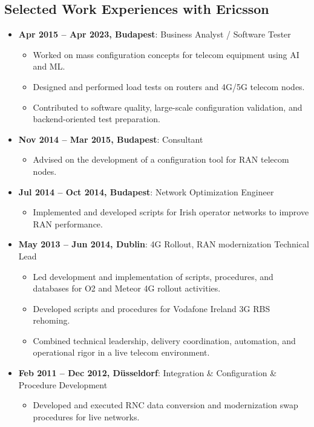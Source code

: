 \documentclass[a4paper,10pt]{article}
\begin{document}
\subsection*{Selected Work Experiences with Ericsson}
\begin{itemize}
    \item \textbf{Apr 2015 -- Apr 2023, Budapest}: Business Analyst / Software Tester
    \begin{itemize}
        \item Worked on mass configuration concepts for telecom equipment using AI and ML.
        \item Designed and performed load tests on routers and 4G/5G telecom nodes.
        \item Contributed to software quality, large-scale configuration validation, and backend-oriented test preparation.
    \end{itemize}
    \item \textbf{Nov 2014 -- Mar 2015, Budapest}: Consultant
    \begin{itemize}
        \item Advised on the development of a configuration tool for RAN telecom nodes.
    \end{itemize}
    \item \textbf{Jul 2014 -- Oct 2014, Budapest}: Network Optimization Engineer
    \begin{itemize}
        \item Implemented and developed scripts for Irish operator networks to improve RAN performance.
    \end{itemize}
    \item \textbf{May 2013 -- Jun 2014, Dublin}: 4G Rollout, RAN modernization Technical Lead
    \begin{itemize}
        \item Led development and implementation of scripts, procedures, and databases for O2 and Meteor 4G rollout activities.
        \item Developed scripts and procedures for Vodafone Ireland 3G RBS rehoming.
        \item Combined technical leadership, delivery coordination, automation, and operational rigor in a live telecom environment.
    \end{itemize}
    \item \textbf{Feb 2011 -- Dec 2012, Düsseldorf}: Integration \& Configuration \& Procedure Development
    \begin{itemize}
        \item Developed and executed RNC data conversion and modernization swap procedures for live networks.

\end{itemize}
\end{itemize}
\end{document}
